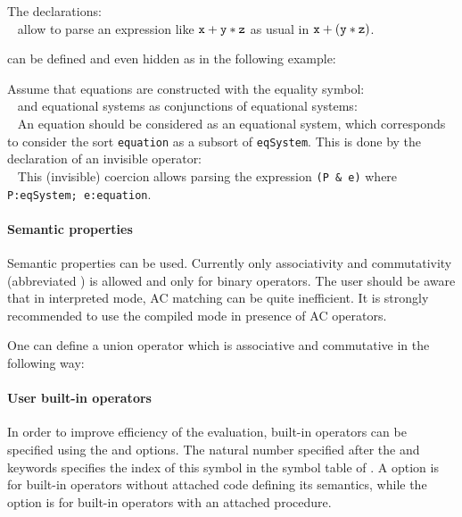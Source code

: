\EX
The declarations:\\
{\tt 
{}
}
allow to parse an expression like $\tt x + y * z$ as usual in 
$\tt x + (y * z)$.
\FEX

 can be defined and even hidden as in the following
example:

\EX
Assume that equations are constructed with the equality symbol:\\
{\tt 
{}}
and equational systems as conjunctions of equational systems:\\
{\tt 
{}}
An equation should be considered as an equational system, 
which corresponds to consider the sort {\tt equation} as a subsort 
of {\tt eqSystem}. This is done by the declaration of an invisible
operator:\\ 
{\tt 
{}}
This (invisible) coercion allows parsing  the expression {\tt (P \& e)}
where {\tt P:eqSystem; e:equation}.

\FEX

\paragraph{Semantic properties}
Semantic properties can be used.  Currently only associativity and
commutativity (abbreviated ) is allowed and only for binary
operators. 
The user should be aware that in interpreted mode, AC matching 
can be quite inefficient. It  is strongly recommended to use the
compiled mode in presence of AC operators.

\EX
One can define a union operator which is associative and commutative
in the following way:\\
{\tt {}}
\FEX

\paragraph{User built-in operators}
In order to improve efficiency of the evaluation, built-in
operators can be specified using the  and 
options. The natural number specified after the  and
 keywords specifies the index of this symbol in the symbol
table of \elan. A  option is for built-in operators
without attached code defining its semantics, while the 
option is for built-in operators with an attached procedure.

